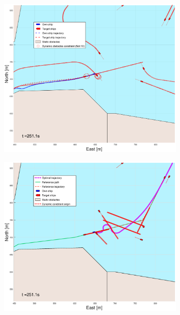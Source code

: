 \begin{figure}[ht]
\begin{subfigure}[b]{0.499\textwidth}
    \end{subfigure}
    \hfill
    \\
    \begin{subfigure}[b]{0.49\textwidth}
        \centering
        \includegraphics[width=\textwidth]{Images/Figures/Trheimfjord/_Simple_1fig1_time=251}
    \end{subfigure}
    \hfill
    \begin{subfigure}[b]{0.499\textwidth}
        \centering
        \includegraphics[width=\textwidth]{Images/Figures/Trheimfjord/_Simple_1fig999_time=251}

\end{subfigure}
\end{figure}
